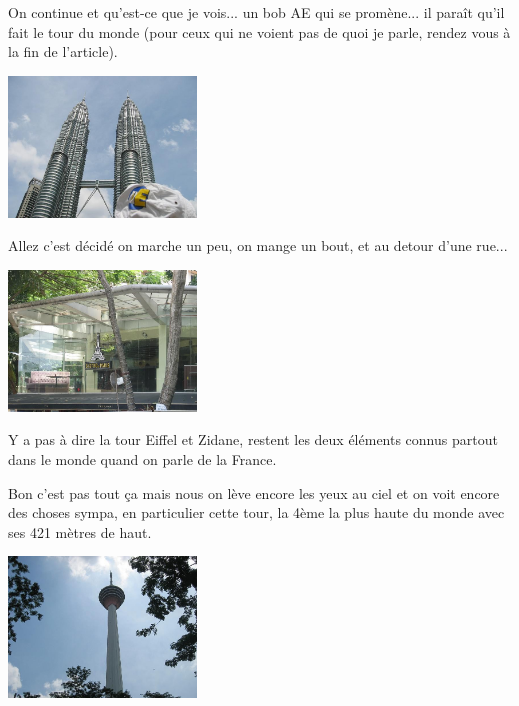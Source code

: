 \begin{multicols}{2}
On continue et qu'est-ce que je vois... un bob AE qui se promène... il paraît qu'il fait le tour du monde (pour ceux qui ne voient pas de quoi je parle, rendez vous à la fin de l'article).

\smallbreak
\hspace*{-0.65cm}
\includegraphics[width=5cm]{articles/Kuala-lumpur/1210432316GlgU.jpg}
\smallbreak

Allez c'est décidé on marche un peu, on mange un bout, et au detour d'une rue...

\smallbreak
\hspace*{-0.65cm}
\includegraphics[width=5cm]{articles/Kuala-lumpur/1211015560vRGE.jpg}
\smallbreak

Y a pas à dire la tour Eiffel et Zidane, restent les deux éléments connus partout dans le monde quand on parle de la France.

Bon c'est pas tout ça mais nous on lève encore les yeux au ciel et on voit encore des choses sympa, en particulier cette tour, la 4ème la plus haute du monde avec ses 421 mètres de haut.

\smallbreak
\hspace*{-0.65cm}
\includegraphics[width=5cm]{articles/Kuala-lumpur/1211014906Nl6S.jpg}
\smallbreak


\end{multicols}
